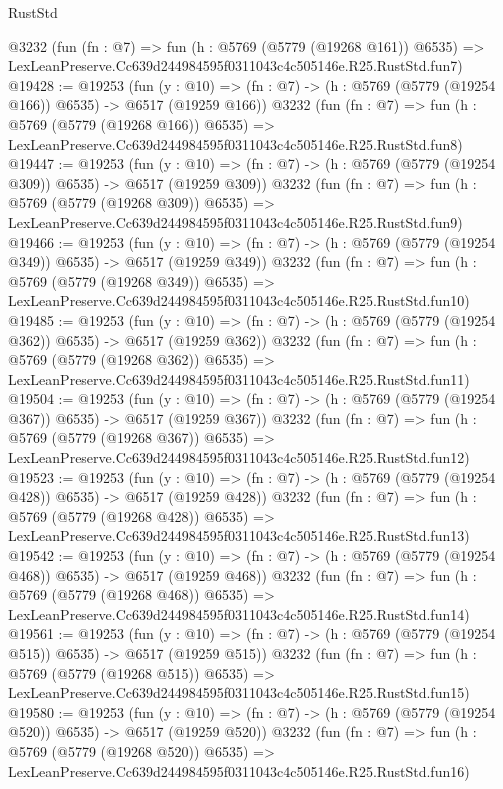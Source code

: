 \begin{lexlean}{RustStd}
\begin{coremodule}
    @3232
    (fun (fn : @7) =>
    fun (h : @5769 (@5779 (@19268 @161)) @6535) =>
    LexLeanPreserve.Cc639d244984595f0311043c4c505146e.R25.RustStd.fun7)
@19428 := @19253
    (fun (y : @10) => (fn : @7) -> (h : @5769 (@5779 (@19254 @166)) @6535) -> @6517 (@19259 @166))
    @3232
    (fun (fn : @7) =>
    fun (h : @5769 (@5779 (@19268 @166)) @6535) =>
    LexLeanPreserve.Cc639d244984595f0311043c4c505146e.R25.RustStd.fun8)
@19447 := @19253
    (fun (y : @10) => (fn : @7) -> (h : @5769 (@5779 (@19254 @309)) @6535) -> @6517 (@19259 @309))
    @3232
    (fun (fn : @7) =>
    fun (h : @5769 (@5779 (@19268 @309)) @6535) =>
    LexLeanPreserve.Cc639d244984595f0311043c4c505146e.R25.RustStd.fun9)
@19466 := @19253
    (fun (y : @10) => (fn : @7) -> (h : @5769 (@5779 (@19254 @349)) @6535) -> @6517 (@19259 @349))
    @3232
    (fun (fn : @7) =>
    fun (h : @5769 (@5779 (@19268 @349)) @6535) =>
    LexLeanPreserve.Cc639d244984595f0311043c4c505146e.R25.RustStd.fun10)
@19485 := @19253
    (fun (y : @10) => (fn : @7) -> (h : @5769 (@5779 (@19254 @362)) @6535) -> @6517 (@19259 @362))
    @3232
    (fun (fn : @7) =>
    fun (h : @5769 (@5779 (@19268 @362)) @6535) =>
    LexLeanPreserve.Cc639d244984595f0311043c4c505146e.R25.RustStd.fun11)
@19504 := @19253
    (fun (y : @10) => (fn : @7) -> (h : @5769 (@5779 (@19254 @367)) @6535) -> @6517 (@19259 @367))
    @3232
    (fun (fn : @7) =>
    fun (h : @5769 (@5779 (@19268 @367)) @6535) =>
    LexLeanPreserve.Cc639d244984595f0311043c4c505146e.R25.RustStd.fun12)
@19523 := @19253
    (fun (y : @10) => (fn : @7) -> (h : @5769 (@5779 (@19254 @428)) @6535) -> @6517 (@19259 @428))
    @3232
    (fun (fn : @7) =>
    fun (h : @5769 (@5779 (@19268 @428)) @6535) =>
    LexLeanPreserve.Cc639d244984595f0311043c4c505146e.R25.RustStd.fun13)
@19542 := @19253
    (fun (y : @10) => (fn : @7) -> (h : @5769 (@5779 (@19254 @468)) @6535) -> @6517 (@19259 @468))
    @3232
    (fun (fn : @7) =>
    fun (h : @5769 (@5779 (@19268 @468)) @6535) =>
    LexLeanPreserve.Cc639d244984595f0311043c4c505146e.R25.RustStd.fun14)
@19561 := @19253
    (fun (y : @10) => (fn : @7) -> (h : @5769 (@5779 (@19254 @515)) @6535) -> @6517 (@19259 @515))
    @3232
    (fun (fn : @7) =>
    fun (h : @5769 (@5779 (@19268 @515)) @6535) =>
    LexLeanPreserve.Cc639d244984595f0311043c4c505146e.R25.RustStd.fun15)
@19580 := @19253
    (fun (y : @10) => (fn : @7) -> (h : @5769 (@5779 (@19254 @520)) @6535) -> @6517 (@19259 @520))
    @3232
    (fun (fn : @7) =>
    fun (h : @5769 (@5779 (@19268 @520)) @6535) =>
    LexLeanPreserve.Cc639d244984595f0311043c4c505146e.R25.RustStd.fun16)

\end{coremodule}
\end{lexlean}
